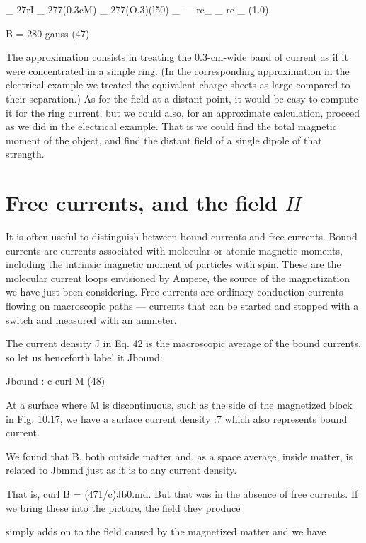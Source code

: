 {_ 27rI _ 277(0.3cM) _ 277(O.3)(l50)
_  --- rc_ _ rc _ (1.0)

B = 280 gauss (47)

The approximation consists in treating the 0.3-cm-wide band of 
current as if it were concentrated in a simple ring. (In the corresponding
approximation in the electrical example we treated the equivalent
charge sheets as large compared to their separation.) As for
the field at a distant point, it would be easy to compute it for the
ring current, but we could also, for an approximate calculation,
proceed as we did in the electrical example. That is we could find
the total magnetic moment of the object, and find the distant field
of a single dipole of that strength.

\section{Free currents, and the field $H$}

It is often useful to distinguish between bound currents and free
currents. Bound currents are currents associated with molecular
or atomic magnetic moments, including the intrinsic magnetic
moment of particles with spin. These are the molecular current
loops envisioned by Ampere, the source of the magnetization we
have just been considering. Free currents are ordinary conduction
currents flowing on macroscopic paths --- currents that can be started
and stopped with a switch and measured with an ammeter.

The current density J in Eq. 42 is the macroscopic average of the
bound currents, so let us henceforth label it Jbound:
\begin{equation}
\end{equation}

Jbound : c curl M (48)

At a surface where M is discontinuous, such as the side of the magnetized
block in Fig. 10.17, we have a surface current density :7 which
also represents bound current.

We found that B, both outside matter and, as a space average,
inside matter, is related to Jbmmd just as it is to any current density.

That is, curl B = (471/c)Jb0.md. But that was in the absence of free
currents. If we bring these into the picture, the field they produce

simply adds on to the field caused by the magnetized matter and
we have
\begin{equation}
\end{equation}

}

